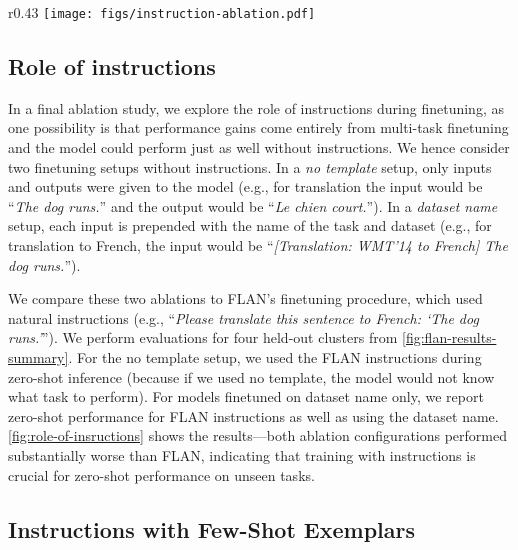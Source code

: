 \documentclass{article} \usepackage{iclr2022_conference,times}
\newcommand{\flan}{FLAN}
\begin{document}
\begin{wrapfigure}{r}{0.43\textwidth}
    \centering
    \vspace{-6mm}
    \texttt{[image: figs/instruction-ablation.pdf]}
    \vspace{-7mm}
    \caption{
    Ablation study result using models with instructions removed from finetuning (FT). 
    }
    \vspace{-3mm}
    \label{fig:role-of-insructions}
\end{wrapfigure}

\subsection{Role of instructions}\label{subsec:role-of-instructions}
In a final ablation study, we explore the role of instructions during finetuning, as one possibility is that performance gains come entirely from multi-task finetuning and the model could perform just as well without instructions.
We hence consider two finetuning setups without instructions.
In a \textit{no template} setup, only inputs and outputs were given to the model (e.g., for translation the input would be ``\textit{The dog runs.}'' and the output would be ``\textit{Le chien court.}'').
In a \textit{dataset name} setup, each input is prepended with the name of the task and dataset (e.g., for translation to French, the input would be ``\textit{[Translation: WMT'14 to French] The dog runs.}'').

We compare these two ablations to \flan{}'s finetuning procedure, which used natural instructions (e.g., ``\textit{Please translate this sentence to French: `The dog runs.'}'').
We perform evaluations for four held-out clusters from \cref{fig:flan-results-summary}.
For the no template setup, we used the \flan{} instructions during zero-shot inference (because if we used no template, the model would not know what task to perform).
For models finetuned on dataset name only, we report zero-shot performance for \flan{} instructions as well as using the dataset name.
\cref{fig:role-of-insructions} shows the results---both ablation configurations performed substantially worse than \flan{}, indicating that training with instructions is crucial for zero-shot performance on unseen tasks.

\subsection{Instructions with Few-Shot Exemplars}\label{subsec:finetune}
\end{document}

